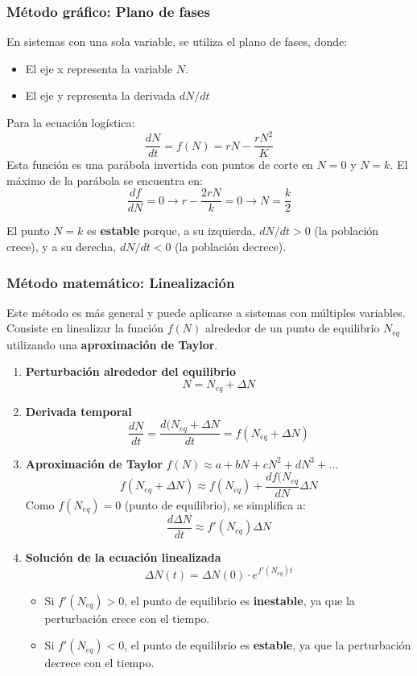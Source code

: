 \subsubsection{Método gráfico: Plano de fases}
En sistemas con una sola variable, se utiliza el plano de fases, donde:
\begin{itemize}
\item El eje x representa la variable $N$.
\item El eje y representa la derivada $dN/dt$
\end{itemize}
Para la ecuación logística:
$$\frac{dN}{dt} = f(N) = rN - \frac{rN^2}{K}$$ 
Esta función es una parábola invertida con puntos de corte en $N = 0$ y $N = k$. El máximo de la parábola se encuentra en:
$$\frac{df}{dN} = 0 \rightarrow r - \frac{2rN}{k} = 0 \rightarrow N = \frac{k}{2}$$

El punto $N = k$ es \textbf{estable} porque, a su izquierda, $dN/dt > 0$ (la población crece), y a su derecha, $dN/dt < 0$ (la población decrece).

\subsubsection{Método matemático: Linealización}
Este método es más general y puede aplicarse a sistemas con múltiples variables. Consiste en linealizar la función $f(N)$ alrededor de un punto de equilibrio $N_{eq}$ utilizando una \textbf{aproximación de Taylor}.
\begin{enumerate}
\item \textbf{Perturbación alrededor del equilibrio}
$$N = N_{eq} + \Delta N$$

\item \textbf{Derivada temporal}
$$\frac{dN}{dt} = \frac{d(N_{eq} + \Delta N}{dt} = f(N_{eq} + \Delta N)$$

\item \textbf{Aproximación de Taylor} $f(N) \approx a + bN + cN^2 + dN^3 + \ldots$
$$f(N_{eq} + \Delta N) \approx f(N_{eq}) + \frac{df(N_{eq}}{dN} \Delta N$$
Como $f(N_{eq}) = 0$ (punto de equilibrio), se simplifica a:
$$\frac{d \Delta N}{dt} \approx f'(N_{eq}) \Delta N$$

\item \textbf{Solución de la ecuación linealizada}
$$\Delta N(t) = \Delta N(0) \cdot e^{f'(N_{eq})t}$$
\begin{itemize}
\item Si $f'(N_{eq}) > 0$, el punto de equilibrio es \textbf{inestable}, ya que la perturbación crece con el tiempo.
\item Si $f'(N_{eq}) < 0$, el punto de equilibrio es \textbf{estable}, ya que la perturbación decrece con el tiempo.
\end{itemize}
\end{enumerate}